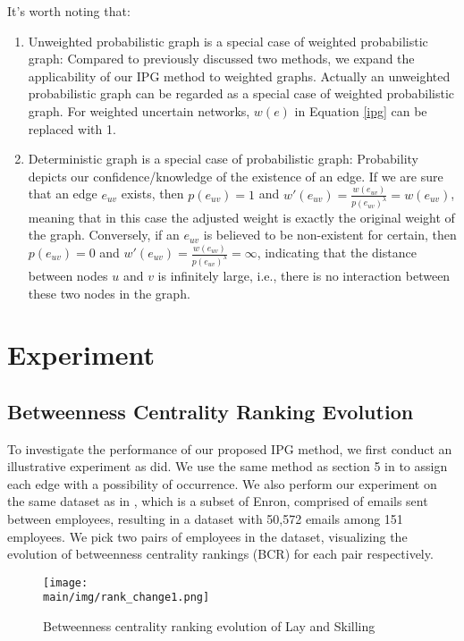 \documentclass[\main/thesis.tex]{subfiles}
\begin{document}
It's worth noting that:
\begin{enumerate}
\item Unweighted probabilistic graph is a special case of weighted probabilistic graph: Compared to previously discussed two methods, we expand the applicability of our IPG method to weighted graphs. Actually an unweighted probabilistic graph can be regarded as a special case of weighted probabilistic graph. For weighted uncertain networks, $w(e)$ in Equation \ref{ipg} can be replaced with 1.
\item Deterministic graph is a special case of probabilistic graph: Probability depicts our confidence/knowledge of the existence of an edge. If we are sure that an edge $e_{uv}$ exists, then $p(e_{uv}) = 1$ and $w'(e_{uv}) = \frac{w(e_{uv})}{p(e_{uv})^\lambda } = w(e_{uv})$, meaning that in this case the adjusted weight is exactly the original weight of the graph. Conversely, if an $e_{uv}$ is believed to be non-existent for certain, then $p(e_{uv}) = 0$ and $w'(e_{uv}) = \frac{w(e_{uv})}{p(e_{uv})^\lambda } = \infty$, indicating that the distance between nodes $u$ and $v$ is infinitely large, i.e., there is no interaction between these two nodes in the graph.
\end{enumerate}

\section{Experiment}
\subsection{Betweenness Centrality Ranking Evolution}
To investigate the performance of our proposed IPG method, we first conduct an illustrative experiment as \cite{pfeiffer2010probabilistic,pfeiffer2011methods} did. We use the same method as section 5 in \cite{pfeiffer2010probabilistic} to assign each edge with a possibility of occurrence. We also perform our experiment on the same dataset as in \cite{pfeiffer2010probabilistic,pfeiffer2011methods}, which is a subset of Enron, comprised of emails sent between employees, resulting in a dataset with 50,572 emails among 151 employees. We pick two pairs of employees in the dataset, visualizing the evolution of betweenness centrality rankings (BCR) for each pair respectively. 
\begin{figure}
\centering
\texttt{[image: \\main/img/rank\_change1.png]}
\caption{Betweenness centrality ranking evolution of Lay and Skilling}
\label{rank_change1}
\end{figure}
\end{document}
